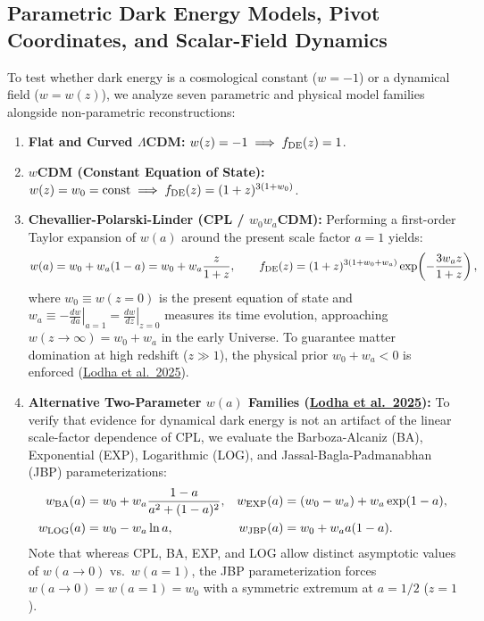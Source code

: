 \documentclass[aps,prd,preprint,superscriptaddress,nofootinbib]{revtex4-2}
\begin{document}
\subsection{Parametric Dark Energy Models, Pivot Coordinates, and Scalar-Field Dynamics}

To test whether dark energy is a cosmological constant ($w = -1$) or a dynamical field ($w = w(z)$), we analyze seven parametric and physical model families alongside non-parametric reconstructions:
\begin{enumerate}
    \setlength{\itemsep}{3pt}
    \item \textbf{Flat and Curved $\Lambda$CDM:} $w(z) = -1 \implies f_{\rm DE}(z) = 1$.
    \item \textbf{$w$CDM (Constant Equation of State):} $w(z) = w_0 = \text{const} \implies f_{\rm DE}(z) = (1+z)^{3(1+w_0)}$.
    \item \textbf{Chevallier-Polarski-Linder (CPL / $w_0 w_a$CDM):} Performing a first-order Taylor expansion of $w(a)$ around the present scale factor $a=1$ yields:
    \begin{equation}
        w(a) = w_0 + w_a (1 - a) = w_0 + w_a \frac{z}{1 + z}, \qquad f_{\rm DE}(z) = (1 + z)^{3(1 + w_0 + w_a)} \exp\!\left( -\frac{3 w_a z}{1 + z} \right),
        \label{m:eq:cpl}
    \end{equation}
    where $w_0 \equiv w(z=0)$ is the present equation of state and $w_a \equiv -\left.\frac{dw}{da}\right|_{a=1} = \left.\frac{dw}{dz}\right|_{z=0}$ measures its time evolution, approaching $w(z \to \infty) = w_0 + w_a$ in the early Universe. To guarantee matter domination at high redshift ($z \gg 1$), the physical prior $w_0 + w_a < 0$ is enforced (\href{https://arxiv.org/abs/2503.14743}{Lodha et al.\ 2025}).
    \item \textbf{Alternative Two-Parameter $w(a)$ Families (\href{https://arxiv.org/abs/2503.14743}{Lodha et al.\ 2025}):} To verify that evidence for dynamical dark energy is not an artifact of the linear scale-factor dependence of CPL, we evaluate the Barboza-Alcaniz (BA), Exponential (EXP), Logarithmic (LOG), and Jassal-Bagla-Padmanabhan (JBP) parameterizations:
    \begin{align}
        w_{\rm BA}(a) &= w_0 + w_a \frac{1 - a}{a^2 + (1 - a)^2}, & w_{\rm EXP}(a) &= (w_0 - w_a) + w_a \exp(1 - a), \nonumber \\
        w_{\rm LOG}(a) &= w_0 - w_a \ln a, & w_{\rm JBP}(a) &= w_0 + w_a a(1 - a).
        \label{m:eq:alt_w}
    \end{align}
    Note that whereas CPL, BA, EXP, and LOG allow distinct asymptotic values of $w(a \to 0)$ vs.\ $w(a=1)$, the JBP parameterization forces $w(a \to 0) = w(a=1) = w_0$ with a symmetric extremum at $a = 1/2$ ($z = 1$).

\end{enumerate}
\end{document}
